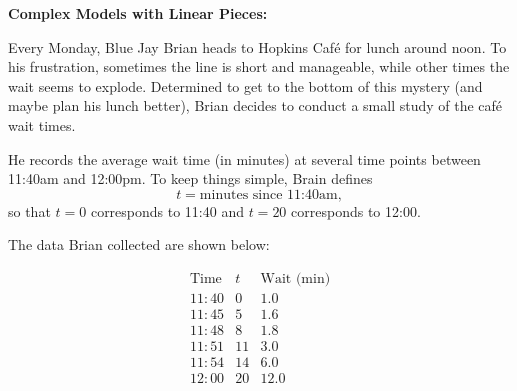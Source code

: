 \documentclass[11pt,addpoints,answers]{exam}
\begin{document}
\begin{questions}

\newpage
\question%

\textbf{Complex Models with Linear Pieces:}

Every Monday, Blue Jay Brian heads to Hopkins Café for lunch around noon. To his frustration, sometimes the line is short and manageable, while other times the wait seems to explode. Determined to get to the bottom of this mystery (and maybe plan his lunch better), Brian decides to conduct a small study of the café wait times.

He records the average wait time (in minutes) at several time points between 11:40am and 12:00pm. To keep things simple, Brain defines
\[
t = \text{minutes since 11:40am},
\]
so that $t=0$ corresponds to 11:40 and $t=20$ corresponds to 12:00.

The data Brian collected are shown below:

\[
\begin{array}{c|c|c|c}
\text{Time} & t & \text{Wait (min)} \\
\hline
11{:}40 & 0 & 1.0 \\
11{:}45 & 5 & 1.6 \\
11{:}48 & 8 & 1.8 \\
11{:}51 & 11 & 3.0 \\
11{:}54 & 14 & 6.0 \\
12{:}00 & 20 & 12.0 \\
\end{array}
\]


\end{questions}
\end{document}
